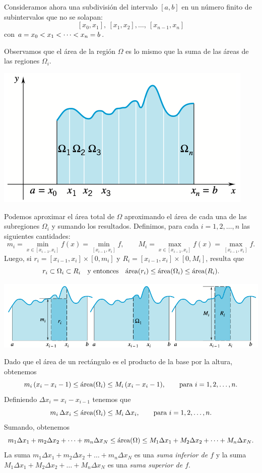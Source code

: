 \noindent
\begin{minipage}{.5\textwidth}
  Consideramos ahora una subdivisión del intervalo $[a,b]$ en un número finito de subintervalos que no se solapan:
  \[
  [x_0,x_1],\ [x_1,x_2],\dots,\ [x_{n-1},x_n]
  \]
  con $\displaystyle a=x_0<x_1<\dots<x_n=b$.

  Observamos que el área de la región $\Omega$ es lo mismo que la suma de las áreas de las regiones $\Omega_i$.
\end{minipage}
\begin{minipage}{.5\textwidth}
  \centering
  \includegraphics[width=.9\textwidth]{pics/area-bajo-curva-particionada.png}
\end{minipage}

Podemos aproximar el área total de $\Omega$ aproximando el área de cada una de las subregiones $\Omega_i$ y sumando los resultados.
Definimos, para cada $i=1,2,\dots,n$ las siguientes cantidades:
\[ 
  m_i = \min_{x\in [x_{i-1},x_i]}f(x)=\min_{[x_{i-1},x_i]}f,
  \qquad
  M_i = \max_{x\in [x_{i-1},x_i]}f(x)=\max_{[x_{i-1},x_i]}f.
\]
Luego, si $r_i = [x_{i-1},x_i]\times [0,m_i]$ y $R_i = [x_{i-1},x_i]\times [0,M_i]$, resulta que
\[
r_i \subset \Omega_i \subset R_i
\quad\text{y entonces}\quad
\mathrm{\protect\acute{a}rea}(r_i)\le \mathrm{\protect\acute{a}rea}(\Omega_i) \le \mathrm{\protect\acute{a}rea}(R_i).
\]

\centerline{
  \includegraphics[width=.9\textwidth]{pics/area-omega-i.png}
}

Dado que el área de un rectángulo es el producto de la base por la altura, obtenemos
\[
m_i\, (x_i-x_i-1)
\le \mathrm{\protect\acute{a}rea}(\Omega_i) \le
M_i\, (x_i-x_i-1),
\qquad\text{para $i=1,2,\dots,n$}.
\]
Definiendo $\Delta x_i=x_i-x_{i-1}$ tenemos que 
\[
m_i\, \Delta x_i
\le \mathrm{\protect\acute{a}rea}(\Omega_i) \le
M_i\, \Delta x_i,
\qquad\text{para $i=1,2,\dots,n$}.
\]
Sumando, obtenemos
\begin{equation}
  \label{eq:L<I<U}
m_1 \Delta x_1 + m_2 \Delta x_2 + \dots + m_n \Delta x_N
\le \mathrm{\protect\acute{a}rea}(\Omega) \le
M_1 \Delta x_1 + M_2 \Delta x_2 + \dots + M_n \Delta x_N.
\end{equation}
La suma $m_1 \Delta x_1 + m_2 \Delta x_2 + \dots + m_n \Delta x_N$ es una \emph{suma inferior de $f$} 
y la suma $M_1 \Delta x_1 + M_2 \Delta x_2 + \dots + M_n \Delta x_N$ es una \emph{suma superior de $f$}.

